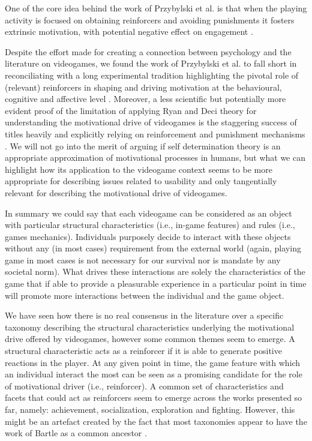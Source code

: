 

One of the core idea behind the work of Przybylski et al. is that when the playing activity is focused on obtaining reinforcers and avoiding punishments it fosters extrinsic motivation, with potential negative effect on engagement \cite{przybylski2010motivational}.  

Despite the effort made for creating a connection between psychology and the literature on videogames, we found the work of Przybylski et al. to fall short in reconciliating with a long experimental tradition highlighting the pivotal role of (relevant) reinforcers in shaping and driving motivation at the behavioural, cognitive and affective level \cite{skinner1953science,schultz1997neural,berridge2004motivation}. Moreover, a less scientific but potentially more evident proof of the limitation of applying Ryan and Deci theory for understanding the motivational drive of videogames is the staggering success of titles heavily and explicitly relying on reinforcement and punishment mechanisms \cite{darksouls,candyc}. We will not go into the merit of arguing if self determination theory is an appropriate approximation of motivational processes in humans, but what we can highlight how its application to the videogame context seems to be more appropriate for describing issues related to usability and only tangentially relevant for describing the motivational drive of videogames.

In summary we could say that each videogame can be considered as an object with particular structural characteristics (i.e., in-game features) and rules (i.e., games mechanics). Individuals purposely decide to interact with these objects without any (in most cases) requirement from the external world (again, playing game in most cases is not necessary for our survival nor is mandate by any societal norm). What drives these interactions are solely the characteristics of the game that if able to provide a pleasurable experience in a particular point in time will promote more interactions between the individual and the game object. 

We have seen how there is no real consensus in the literature over a specific taxonomy describing the structural characteristics underlying the motivational drive offered by videogames, however some common themes seem to emerge. A structural characteristic acts as a reinforcer if it is able to generate positive reactions in the player. At any given point in time, the game feature with which an individual interact the most can be seen as a promising candidate for the role of motivational driver (i.e., reinforcer). A common set of characteristics and facets that could act as reinforcers seem to emerge across the works presented so far, namely: achievement, socialization, exploration and fighting. However, this might be an artefact created by the fact that most taxonomies appear to have the work of Bartle as a common ancestor \cite{bartle1996hearts,yee2006motivations,nacke2011brainhex}. 

